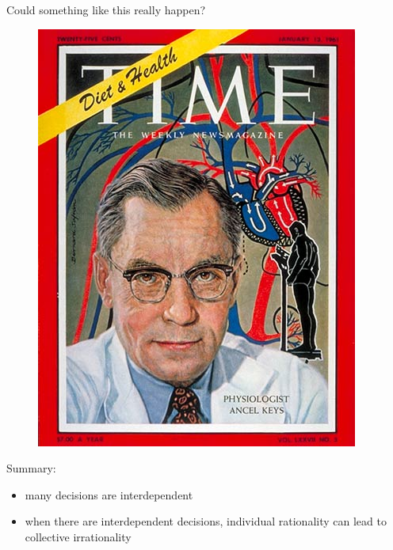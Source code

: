 \documentclass[aspectratio=169]{beamer}
\begin{document}
\begin{frame}

Could something like this really happen?

\begin{figure}
\includegraphics[height=0.70\textheight]{figures/ancel_keys_time}
\end{figure}


\end{frame}
%
%
%
\begin{frame}

Summary:
\begin{itemize}
\item many decisions are interdependent
\pause
\item when there are interdependent decisions, individual rationality can lead to collective irrationality
\end{itemize}

\end{frame}
\end{document}
